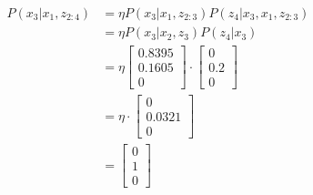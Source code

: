\documentclass[answers]{exam}
\begin{document}
\begin{questions}
\begin{parts}
\begin{solution}
            \begin{align*}
                P(x_3 | x_1, z_{2:4}) & = \eta P(x_3 | x_1, z_{2:3})P(z_4 | x_3, x_1, z_{2:3}) \\
                                      & = \eta P(x_3 | x_2, z_3)P(z_4 | x_3)                   \\
                                      & = \eta \begin{bmatrix}
                                                   0.8395 \\
                                                   0.1605 \\
                                                   0
                                               \end{bmatrix} \cdot \begin{bmatrix}
                                                                       0   \\
                                                                       0.2 \\
                                                                       0
                                                                   \end{bmatrix}              \\
                                      & = \eta \cdot \begin{bmatrix}
                                                         0      \\
                                                         0.0321 \\
                                                         0
                                                     \end{bmatrix}                            \\
                                      & = \begin{bmatrix}
                                              0 \\
                                              1 \\
                                              0
                                          \end{bmatrix}
            \end{align*}


\end{solution}
\end{parts}
\end{questions}
\end{document}
